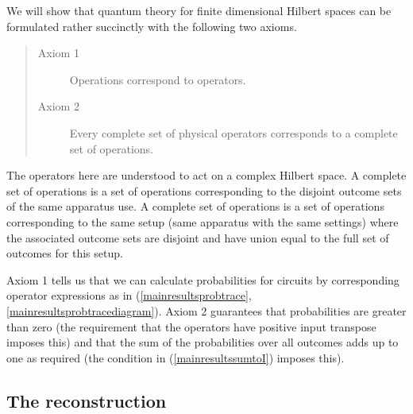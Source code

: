 \documentclass[10pt]{article}
\begin{document}
We will show that quantum theory for finite dimensional Hilbert spaces can be formulated rather succinctly with the following two axioms.
\begin{quote}
\begin{description}
\item[Axiom 1] Operations correspond to operators.
\item[Axiom 2] Every complete set of physical operators corresponds to a complete set of operations.
\end{description}
\end{quote}
The operators here are understood to act on a complex Hilbert space.  A complete set of operations is a set of operations corresponding to the disjoint outcome sets of the same apparatus use.  A complete set of operations is a set of operations corresponding to the same setup (same apparatus with the same settings) where the associated outcome sets are disjoint and have union equal to the full set of outcomes for this setup.

Axiom 1 tells us that we can calculate probabilities for circuits by corresponding operator expressions as in (\ref{mainresultsprobtrace},\ref{mainresultsprobtracediagram}).  Axiom 2 guarantees that probabilities are greater than zero (the requirement that the operators have positive input transpose imposes this) and that the sum of the probabilities over all outcomes adds up to one as required (the condition in (\ref{mainresultssumtoI}) imposes this).

\subsection{The reconstruction}
\end{document}
